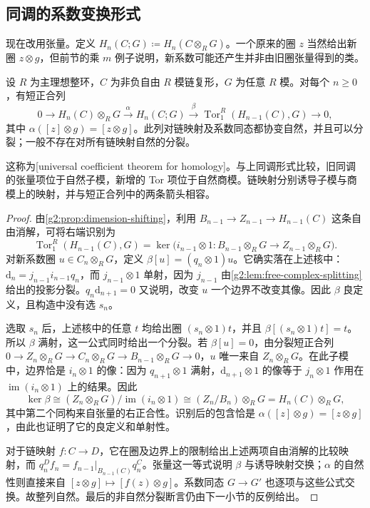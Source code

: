 \subsection{同调的系数变换形式}
\label{g2:subsec:0402:03}
现在改用张量。定义 \(H_n(C;G)\coloneqq H_n(C\otimes_R G)\)。一个原来的圈 \(z\) 当然给出新圈 \(z\otimes g\)，但前节的乘 \(m\) 例子说明，新系数可能还产生并非由旧圈张量得到的类。

\begin{theorem}[同调万有系数定理]\label{g2:thm:uct-homology}
	设 \(R\) 为主理想整环，\(C\) 为非负自由 \(R\) 模链复形，\(G\) 为任意 \(R\) 模。对每个 \(n\ge0\)，有短正合列
	\begin{equation}\label{g2:eq:uct-homology}
		0\longrightarrow H_n(C)\otimes_R G\xrightarrow{\alpha}H_n(C;G)\xrightarrow{\beta}\operatorname{Tor}^R_1(H_{n-1}(C),G)\longrightarrow0,
	\end{equation}
	其中 \(\alpha([z]\otimes g)=[z\otimes g]\)。此列对链映射及系数同态都协变自然，并且可以分裂；一般不存在对所有链映射自然的分裂。
\end{theorem}

这称为[universal coefficient theorem for homology]。与上同调形式比较，旧同调的张量项位于自然子模，新增的 Tor 项位于自然商模。链映射分别诱导子模与商模上的映射，并与短正合列中的两条箭头相容。

\begin{proof}
	由\cref{g2:prop:dimension-shifting}，利用 \(B_{n-1}\to Z_{n-1}\to H_{n-1}(C)\) 这条自由消解，可将右端识别为
	\[
		\operatorname{Tor}^R_1(H_{n-1}(C),G)=\ker\bigl(i_{n-1}\otimes1:B_{n-1}\otimes_R G\longrightarrow Z_{n-1}\otimes_R G\bigr).
	\]
	对新系数圈 \(u\in C_n\otimes_R G\)，定义 \(\beta[u]=(q_n\otimes1)u\)。它确实落在上述核中：\(\mathrm{d}_n=j_{n-1}i_{n-1}q_n\)，而 \(j_{n-1}\otimes1\) 单射，因为 \(j_{n-1}\) 由\cref{g2:lem:free-complex-splitting}给出的投影分裂。\(q_n\mathrm{d}_{n+1}=0\) 又说明，改变 \(u\) 一个边界不改变其像。因此 \(\beta\) 良定义，且构造中没有选 \(s_n\)。

	选取 \(s_n\) 后，上述核中的任意 \(t\) 均给出圈 \((s_n\otimes1)t\)，并且 \(\beta[(s_n\otimes1)t]=t\)。所以 \(\beta\) 满射，这一公式同时给出一个分裂。若 \(\beta[u]=0\)，由分裂短正合列 \(0\to Z_n\otimes_R G\to C_n\otimes_R G\to B_{n-1}\otimes_R G\to0\)，\(u\) 唯一来自 \(Z_n\otimes_R G\)。在此子模中，边界恰是 \(i_n\otimes1\) 的像：因为 \(q_{n+1}\otimes1\) 满射，\(\mathrm{d}_{n+1}\otimes1\) 的像等于 \(j_n\otimes1\) 作用在 \(\operatorname{im}(i_n\otimes1)\) 上的结果。因此
	\[
		\ker\beta\cong (Z_n\otimes_R G)/\operatorname{im}(i_n\otimes1)
		\cong (Z_n/B_n)\otimes_R G=H_n(C)\otimes_R G,
	\]
	其中第二个同构来自张量的右正合性。识别后的包含恰是 \(\alpha([z]\otimes g)=[z\otimes g]\)，由此也证明了它的良定义和单射性。

	对于链映射 \(f:C\to D\)，它在圈及边界上的限制给出上述两项自由消解的比较映射，而 \(q_n^Df_n=f_{n-1}|_{B_{n-1}(C)}q_n^C\)。张量这一等式说明 \(\beta\) 与诱导映射交换；\(\alpha\) 的自然性则直接来自 \([z\otimes g]\mapsto[f(z)\otimes g]\)。系数同态 \(G\to G'\) 也逐项与这些公式交换。故整列自然。最后的非自然分裂断言仍由下一小节的反例给出。
\end{proof}

